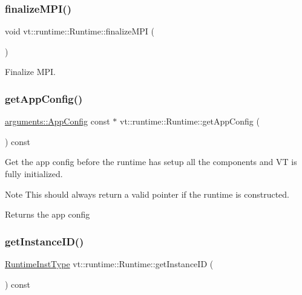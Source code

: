 \subsubsection{\texorpdfstring{finalize\+M\+P\+I()}{finalizeMPI()}}
{\footnotesize\ttfamily void vt\+::runtime\+::\+Runtime\+::finalize\+M\+PI (\begin{DoxyParamCaption}{ }\end{DoxyParamCaption})\hspace{0.3cm}{\ttfamily [protected]}}



Finalize M\+PI. 

\mbox{\label{structvt_1_1runtime_1_1_runtime_aebf06f17830f0d7f1377c14ce5c38845}} 
\subsubsection{\texorpdfstring{get\+App\+Config()}{getAppConfig()}}
{\footnotesize\ttfamily \hyperlink{structvt_1_1arguments_1_1_app_config}{arguments\+::\+App\+Config} const  $\ast$ vt\+::runtime\+::\+Runtime\+::get\+App\+Config (\begin{DoxyParamCaption}{ }\end{DoxyParamCaption}) const}



Get the app config before the runtime has setup all the components and VT is fully initialized. 

\begin{DoxyNote}{Note}
This should always return a valid pointer if the runtime is constructed.
\end{DoxyNote}
\begin{DoxyReturn}{Returns}
the app config 
\end{DoxyReturn}
\mbox{\label{structvt_1_1runtime_1_1_runtime_a06400b91b766f83d4b630bdc9ed840b1}} 
\subsubsection{\texorpdfstring{get\+Instance\+I\+D()}{getInstanceID()}}
{\footnotesize\ttfamily \hyperlink{namespacevt_1_1runtime_afca910c1b38b3975f7c1da8001a77d58}{Runtime\+Inst\+Type} vt\+::runtime\+::\+Runtime\+::get\+Instance\+ID (\begin{DoxyParamCaption}{ }\end{DoxyParamCaption}) const\hspace{0.3cm}{\ttfamily [inline]}}



